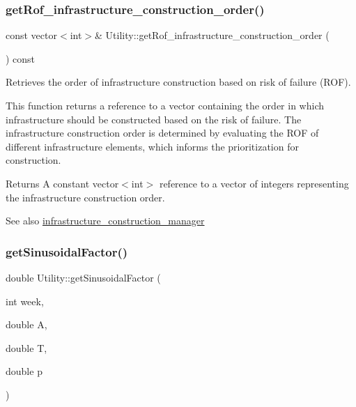 \subsubsection{\texorpdfstring{get\+Rof\+\_\+infrastructure\+\_\+construction\+\_\+order()}{getRof\_infrastructure\_construction\_order()}}
{\footnotesize\ttfamily const vector$<$int$>$\& Utility\+::get\+Rof\+\_\+infrastructure\+\_\+construction\+\_\+order (\begin{DoxyParamCaption}{ }\end{DoxyParamCaption}) const}



Retrieves the order of infrastructure construction based on risk of failure (R\+OF). 

This function returns a reference to a vector containing the order in which infrastructure should be constructed based on the risk of failure. The infrastructure construction order is determined by evaluating the R\+OF of different infrastructure elements, which informs the prioritization for construction.

\begin{DoxyReturn}{Returns}
A constant vector$<$int$>$ reference to a vector of integers representing the infrastructure construction order.
\end{DoxyReturn}
\begin{DoxySeeAlso}{See also}
\mbox{\hyperlink{classUtility_a2eff94831dd7a4b7a4243ef69c5311d9}{infrastructure\+\_\+construction\+\_\+manager}} 
\end{DoxySeeAlso}
\mbox{\label{classUtility_affbfd106c7b5cdf6703d01d6ad838fde}} 
\subsubsection{\texorpdfstring{get\+Sinusoidal\+Factor()}{getSinusoidalFactor()}}
{\footnotesize\ttfamily double Utility\+::get\+Sinusoidal\+Factor (\begin{DoxyParamCaption}\item[{int}]{week,  }\item[{double}]{A,  }\item[{double}]{T,  }\item[{double}]{p }\end{DoxyParamCaption})}



